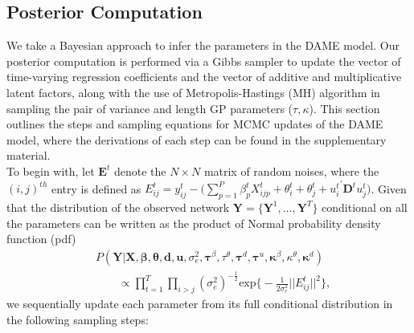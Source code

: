 \documentclass[a4paper]{article}
\begin{document}
\subsection{Posterior Computation}\label{subsec: posterior computation}
We take a Bayesian approach to infer the parameters in the DAME model. Our posterior computation is performed via a Gibbs sampler to update the vector of time-varying regression coefficients and the vector of additive and multiplicative latent factors, along with the use of Metropolis-Hastings (MH) algorithm in sampling the pair of variance and length GP parameters ($\tau, \kappa$). This section outlines the steps and sampling equations for MCMC updates of the DAME model, where the derivations of each step can be found in the supplementary material.\\ \newline
To begin with, let $\mathbf{E}^t$ denote the $N \times N$ matrix of random noises, where the $(i, j)^{th}$ entry is defined as $E^t_{ij} = y^t_{ij}-\big(\sum\limits_{p=1}^P \beta^t_{p}X^t_{ijp}+\theta^t_{i}+\theta^t_{j}+{u^t_{i}}^\prime \mathbf{D}^tu^t_{j}\big)$. Given that the distribution of the observed network $\mathbf{Y}= \{\mathbf{Y}^1,\ldots,\mathbf{Y}^T\}$ conditional on all the parameters can be written as the product of Normal probability density function (pdf)
\begin{equation}
\begin{aligned}
	&P(\mathbf{Y}|\mathbf{X}, \boldsymbol{\beta}, \boldsymbol{\theta}, \boldsymbol{d}, \boldsymbol{u},\sigma_e^2, \boldsymbol\tau^{\beta}, \tau^{\theta}, \boldsymbol\tau^{d}, \boldsymbol\tau^{u}, \boldsymbol\kappa^\beta, \kappa^\theta, \boldsymbol\kappa^d)\\&\quad\quad\propto  \prod_{t=1}^T\prod_{i>j}(\sigma_e^2)^{-\frac{1}{2}}\mbox{exp}\Big\{-\frac{1}{2\sigma_e^2}||E^t_{ij}||^2\Big\},
	\end{aligned}
\end{equation}
we sequentially update each parameter from its full conditional distribution in the following sampling steps:
\end{document}

